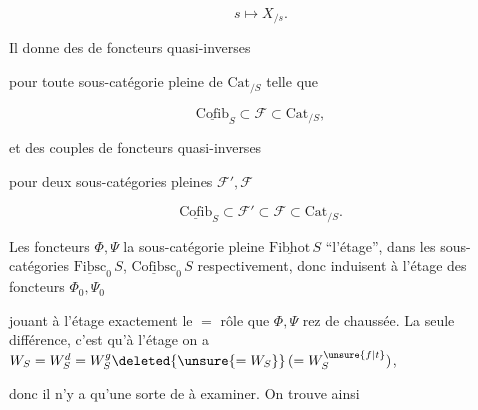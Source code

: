 \[
s\longmapsto X_{/s}.
\]

Il donne des  de foncteurs quasi-inverses


pour toute sous-catégorie pleine  de $\mathrm{Cat}_{/S}$ telle que

\[
\underline{\mathrm{Cofib}}_S\subset\mathcal{F}\subset\mathrm{Cat}_{/S},
\]

et des couples de foncteurs quasi-inverses


pour deux sous-catégories pleines $\mathcal{F}',\mathcal{F}$

\[
\underline{\mathrm{Cofib}}_S\subset\mathcal{F}'\subset\mathcal{F}\subset\mathrm{Cat}_{/S}.
\]

Les foncteurs $\Phi,\Psi$   la sous-catégorie pleine $\underline{\mathrm{Fibhot}}\,S$  ``l'étage'', dans les sous-catégories $\underline{\mathrm{Fibsc}}_0\,S$, $\underline{\mathrm{Cofibsc}}_0\,S$ respectivement, donc induisent à l'étage des foncteurs $\Phi_0,\Psi_0$


jouant à l'étage exactement le $=$ rôle que $\Phi,\Psi$  rez de chaussée. La seule différence, c'est qu'à l'étage on a $W_S=W_S^d=W_S^g\deleted{\unsure{=W_S}}\,(=W_S^{\unsure{f|t}})$,

donc il n'y a qu'une sorte de   à examiner. On trouve ainsi

